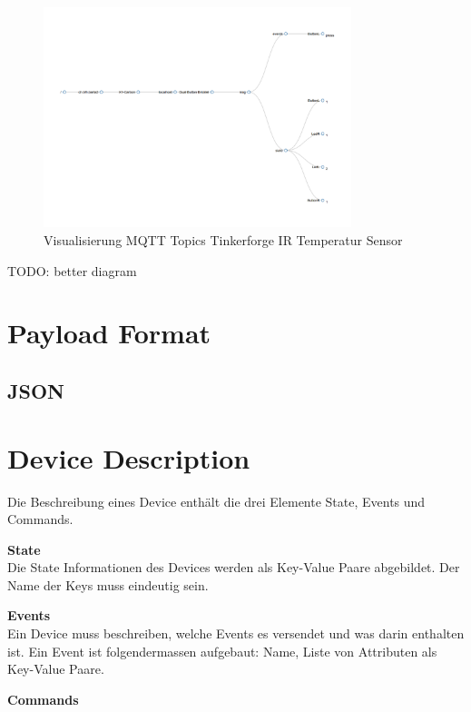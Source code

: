 \begin{figure}[H]
	\centering
		\includegraphics[width=0.8\textwidth]{bilder/TopicHierarchie_Bsp_Dualbutton.png}
	\caption{\label{fig:tempitTopics}Visualisierung MQTT Topics Tinkerforge IR Temperatur Sensor}
\end{figure}

TODO: better diagram

\section{Payload Format}

\subsection{JSON}



\section{Device Description}

Die Beschreibung eines Device enthält die drei Elemente State, Events und Commands.

\textbf{State} \\
Die State Informationen des Devices werden als Key-Value Paare abgebildet. Der Name der Keys muss eindeutig sein.

\textbf{Events} \\
Ein Device muss beschreiben, welche Events es versendet und was darin enthalten ist.
Ein Event ist folgendermassen aufgebaut:
Name, Liste von Attributen als Key-Value Paare.

\textbf{Commands}
